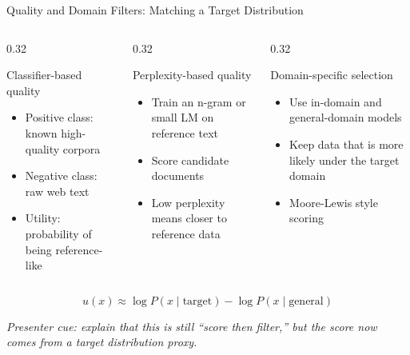 \documentclass[aspectratio=169]{beamer}
\begin{document}
\begin{frame}{Quality and Domain Filters: Matching a Target Distribution}

\begin{columns}[T,totalwidth=\textwidth]

\begin{column}{0.32\textwidth}
\begin{block}{Classifier-based quality}
\begin{itemize}
  \item Positive class: known high-quality corpora
  \item Negative class: raw web text
  \item Utility: probability of being reference-like
\end{itemize}
\end{block}
\end{column}

\begin{column}{0.32\textwidth}
\begin{block}{Perplexity-based quality}
\begin{itemize}
  \item Train an n-gram or small LM on reference text
  \item Score candidate documents
  \item Low perplexity means closer to reference data
\end{itemize}
\end{block}
\end{column}

\begin{column}{0.32\textwidth}
\begin{block}{Domain-specific selection}
\begin{itemize}
  \item Use in-domain and general-domain models
  \item Keep data that is more likely under the target domain
  \item Moore-Lewis style scoring
\end{itemize}
\end{block}
\end{column}

\end{columns}

\vspace{0.9em}

\begin{center}
\large
\[
u(x) \approx \log P(x \mid \text{target}) - \log P(x \mid \text{general})
\]
\end{center}

\vspace{-0.4em}
\footnotesize\textit{Presenter cue: explain that this is still ``score then filter,'' but the score now comes from a target distribution proxy.}

\end{frame}
\end{document}
